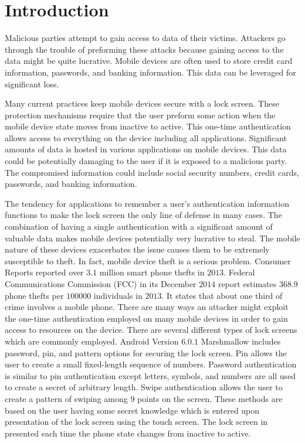 \section{Introduction}
Malicious parties attempt to gain access to data of their victims. 
Attackers go through the trouble of
preforming these attacks because
gaining access to the data might be quite lucrative.
%
Mobile devices are often used to store
credit card information, passwords, and banking information.
This data can be leveraged for significant loss.

Many current practices keep mobile devices secure
with a lock screen.
These protection mechanisms require
that the user preform some action 
when the mobile device state moves from inactive to active.
This one-time authentication allows access 
to everything on the device
including all applications.
% 
Significant amounts of data is hosted 
in various applications on mobile devices.
This data could be potentially damaging to
the user if it is exposed to a malicious party.
The compromised information could include
social security numbers, credit cards, passwords, and banking information.

The tendency for applications to remember a user's
authentication information functions
to make the lock screen the only line of defense in many cases.
%
The combination of
having a single authentication with a significant amount
of valuable data makes mobile devices
potentially very lucrative to steal.
%
The mobile nature of these devices 
exacerbates the issue
causes them to be extremely susceptible to theft.
%
In fact, mobile device theft is a serious problem.
Consumer Reports \cite{CR14}
reported over $3.1$ million smart phone thefts in $2013$. 
Federal Communications Commission (FCC)\cite{FCC14}
in its December $2014$ report 
estimates $368.9$ phone thefts per $100000$ individuals in $2013$. 
It states that about one third of crime involves a mobile phone.
%
There are many ways an attacker might
exploit the one-time authentication 
employed on many mobile devices
in order to gain access to resources on the device.
There are several different types of
lock screens which are commonly employed.
Android Version $6.0.1$ Marshmallow includes
password, pin, and pattern options for
securing the lock screen.
%
Pin allows the user to create a small fixed-length sequence of numbers.
Password authentication is similar to pin authentication
except letters, symbols, and numbers
are all used to create a secret of arbitrary length.
Swipe authentication
allows the user to create a pattern of swiping
among $9$ points on the screen.
These methods are based on the user having some secret knowledge
which is entered 
upon presentation of the lock screen
using the touch screen.
The lock screen in presented each time the phone state
changes from inactive to active.

